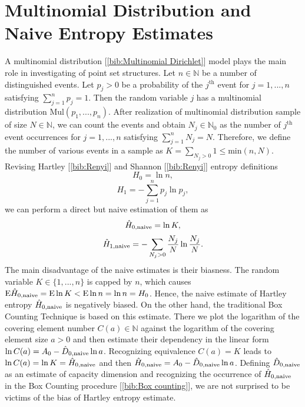 \section {Multinomial Distribution and Naive Entropy Estimates}

A multinomial distribution [\ref{bib:Multinomial Dirichlet}] model plays the main role in investigating of point set structures. Let $n \in \mathbb{N}$ be a number of distinguished events. Let $p_{j} > 0$ be a probability of the $j^{\text{th}}$ event for $j = 1,...,n$ satisfying $ \sum_{j=1}^{n} p_{j} =1$. Then the random variable $j$ has a multinomial distribution $\text{Mul}(p_{1},...,p_{n})$. After realization of multinomial distribution sample of size $N \in \mathbb{N}$, we can count the events and obtain $N_{j} \in \mathbb{N}_{0}$ as the number of $j^{\text{th}}$ event occurrences for $j=1,...,n$ satisfying $\sum_{j=1}^{n} N_{j} = N$. Therefore, we define the number of various events in a sample as $K = \sum_{N_{j}>0} 1 \le \text{min}(n,N)$. Revising Hartley [\ref{bib:Renyi}] and Shannon [\ref{bib:Renyi}] entropy definitions
\begin{equation} 
\label{eq:hnula}
H_{0}=\ln{n},
\end{equation} 
\begin{equation} 
\label{eq:hjedna}
H_{1}=-\sum_{j=1}^{n} p_{j}\ln{p_{j}},
\end{equation}   
we can perform a direct but naive estimation of them as
\begin{equation} 
\label{eq:hnulaap}
\hat{H}_{0,\mbox{\scriptsize{naive}}}=\ln{K},
\end{equation} 
\begin{equation} 
\label{eq:hjednaap}
\hat{H}_{1,\mbox{\scriptsize{naive}}}=-\sum_{N_{j}>0} \frac{N_{j}}{N}\ln{\frac{N_{j}}{N}}.
\end{equation}   
The main disadvantage of the naive estimates is their biasness. The random variable $K \in \{ 1,...,n \} $ is capped by $n$, which causes $\text{E}\hat{H}_{0,\mbox{\scriptsize{naive}}} = \text{E}\ln{K} < \text{E}\ln{n} = \ln{n} = H_{0}$. Hence, the naive estimate of Hartley entropy $\hat{H}_{0,\mbox{\scriptsize{naive}}}$ is negatively biased. On the other hand, the traditional Box Counting Technique is based on this estimate. There we plot the logarithm of the covering element number $C(a) \in \mathbb{N}$ against the logarithm of the covering element size $a > 0$ and then estimate their dependency in the linear form $\ln{C(a)} = A_{0} - \hat{D}_{0,\mbox{\scriptsize{naive}}}\ln{a}$. Recognizing equivalence $C(a) = K$ leads to $\ln{C(a)} = \ln{K} = \hat{H}_{0,\mbox{\scriptsize{naive}}}$ and then $\hat{H}_{0,\mbox{\scriptsize{naive}}} = A_{0} - \hat{D}_{0,\mbox{\scriptsize{naive}}}\ln{a}$. Defining $\hat{D}_{0,\mbox{\scriptsize{naive}}}$ as an estimate of capacity dimension and recognizing the occurrence of $\hat{H}_{0,\mbox{\scriptsize{naive}}}$ in the Box Counting procedure [\ref{bib:Box counting}], we are not surprised to be victims of the bias of Hartley entropy estimate.\\ 
